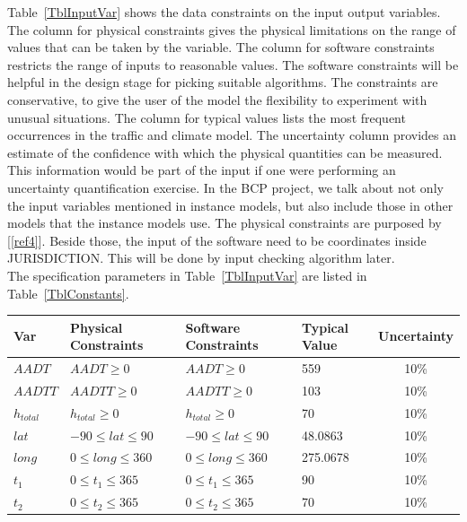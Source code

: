 \documentclass[12pt]{article}
\newcommand{\reref}[1]{\ref{#1}}
\begin{document}
Table~\ref{TblInputVar} shows the data constraints on the input output
variables. The column for physical constraints gives the physical limitations
on the range of values that can be taken by the variable. The column for
software constraints restricts the range of inputs to reasonable values. The software constraints will be helpful in the design stage for picking suitable
algorithms.  The constraints are conservative, to give the user of the model the
flexibility to experiment with unusual situations. The column for typical values lists the most frequent occurrences in the traffic and climate model. The uncertainty column
provides an estimate of the confidence with which the physical quantities can be
measured.  This information would be part of the input if one were performing an uncertainty quantification exercise. In the BCP project, we talk about not only the input variables mentioned in instance models, but also include those in other models that the instance models use. The physical constraints are purposed by [\reref{ref4}]. Beside those, the input of the software need to be coordinates inside JURISDICTION. This will be done by input checking algorithm later. \\
The specification parameters in Table~\ref{TblInputVar} are listed in
Table~\ref{TblConstants}.

\begin{table}[!h]
  \caption{Input Variables} \label{TblInputVar}
  \renewcommand{\arraystretch}{1.2}
\noindent \begin{longtable*}{l l l l c} 
  \toprule
  \textbf{Var} & \textbf{Physical Constraints} & \textbf{Software Constraints} &
                             \textbf{Typical Value} & \textbf{Uncertainty}\\
  \midrule 
  $AADT$ & $AADT \ge 0$ & $AADT \ge 0$ & 559 & 10\%  \\
  $AADTT$ & $AADTT \ge 0$ & $AADTT \ge 0$ & 103  & 10\%
  \\
  $h_{total}$ & $h_{total} \ge 0$ & $h_{total} \ge 0$ &  70  & 10\%
  \\
  $lat$ & $-90 \leq lat \leq 90$ & $-90 \leq lat \leq 90$ & 48.0863 & 10\%
  \\
  $long$ & $0 \leq long \leq 360$ & $0 \leq long \leq 360$ &  275.0678 & 10\%
  \\
  $t_1$ & $0 \leq t_1 \leq 365$ & $0 \leq t_1 \leq 365$ &  90  & 10\%
  \\
  $t_2$ & $0 \leq t_2 \leq 365$ & $0 \leq t_2 \leq 365$ &  70  & 10\%
  \\
  \bottomrule
\end{longtable*}
\end{table}
\end{document}
